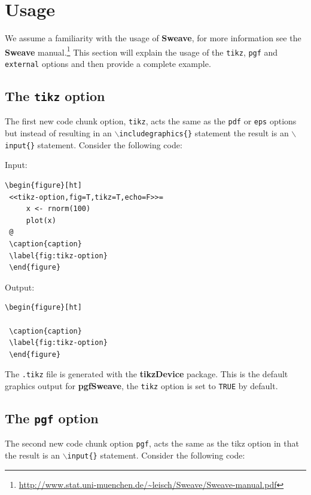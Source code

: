 \documentclass{article}
\newcommand{\code}{\texttt}
\newcommand{\pkg}{\textbf}
\begin{document}
\section{Usage}

We assume a familiarity with the usage of \pkg{Sweave}, for more information see the \pkg{Sweave} manual.\footnote{\url{http://www.stat.uni-muenchen.de/~leisch/Sweave/Sweave-manual.pdf}}  This section will explain the usage of the \code{tikz}, \code{pgf} and \code{external} options and then provide a complete example.

\subsection{The \code{tikz} option}
The first new code chunk option, \code{tikz}, acts the same as the \code{pdf} or \code{eps} options but instead of resulting in an \code{$\backslash$includegraphics\{\}} statement the 
result is an \code{$\backslash$input\{\}} statement. Consider the following code:

\begin{minipage}[!ht]{.5\linewidth}
Input:
\begin{Verbatim}[frame=single]
 \begin{figure}[ht]
 <<tikz-option,fig=T,tikz=T,echo=F>>=
     x <- rnorm(100)
     plot(x)
 @  
 \caption{caption}
 \label{fig:tikz-option}
 \end{figure}
\end{Verbatim}
\end{minipage}
\begin{minipage}[!ht]{.5\linewidth}
Output:
\begin{Verbatim}[frame=single]
 \begin{figure}[ht]
 
 \caption{caption}
 \label{fig:tikz-option}
 \end{figure}
\end{Verbatim}
\end{minipage}

\vspace{.5cm}
The \code{.tikz} file is generated with the \pkg{tikzDevice} package.  {\color{red} This is the default graphics output for \pkg{pgfSweave}, the \code{tikz} option is set to \code{TRUE} by default.}

\subsection{The \code{pgf} option}
The second new code chunk option \code{pgf}, acts the same as the tikz option in that the result is an \code{$\backslash$input\{\}} statement.  Consider the following code:
\end{document}
